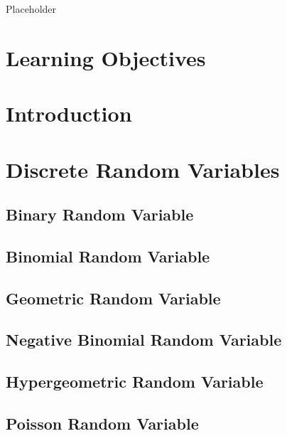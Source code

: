 \documentclass[
]{krantz}
\begin{document}
Placeholder

\hypertarget{learning-objectives-2}{%
\section{Learning Objectives}\label{learning-objectives-2}}

\hypertarget{introduction}{%
\section{Introduction}\label{introduction}}

\hypertarget{discrete-random-variables}{%
\section{Discrete Random Variables}\label{discrete-random-variables}}

\hypertarget{sec-binary}{%
\subsection{Binary Random Variable}\label{sec-binary}}

\hypertarget{sec-binomial}{%
\subsection{Binomial Random Variable}\label{sec-binomial}}

\hypertarget{geometric-random-variable}{%
\subsection{Geometric Random Variable}\label{geometric-random-variable}}

\hypertarget{negative-binomial-random-variable}{%
\subsection{Negative Binomial Random Variable}\label{negative-binomial-random-variable}}

\hypertarget{hypergeometric-random-variable}{%
\subsection{Hypergeometric Random Variable}\label{hypergeometric-random-variable}}

\hypertarget{poisson-random-variable}{%
\subsection{Poisson Random Variable}\label{poisson-random-variable}}
\end{document}
